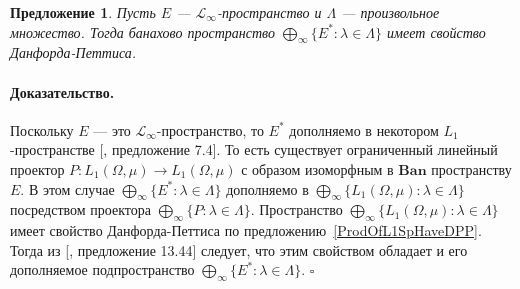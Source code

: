 \documentclass[12pt]{article}
\newtheorem{proposition}[theorem]{Предложение}
\renewenvironment{proof}{\paragraph{Доказательство.}}{\hfill$\square$\medskip}
\begin{document}
\begin{proposition}\label{ProdOfDualsOfMthscrLInftySpHaveDPP} Пусть $E$ ---
    $\mathscr{L}_\infty$-пространство и $\Lambda$ --- произвольное множество.
    Тогда банахово пространство $\bigoplus_\infty \{E^*:\lambda\in\Lambda \}$
    имеет свойство Данфорда-Петтиса.
\end{proposition}
\begin{proof} Поскольку $E$ --- это $\mathscr{L}_\infty$-пространство, то $E^*$
    дополняемо в некотором $L_1$-пространстве
    [\cite{LinPelAbsSumOpInLpSpAndApp}, предложение 7.4]. То есть существует
    ограниченный линейный проектор $P:L_1(\Omega,\mu)\to L_1(\Omega,\mu)$ с
    образом  изоморфным в $\mathbf{Ban}$ пространству $E$. В этом случае
    $\bigoplus_\infty \{ E^*:\lambda\in\Lambda \}$ дополняемо в
    $\bigoplus_\infty \{ L_1(\Omega,\mu):\lambda\in\Lambda \}$ посредством
    проектора $\bigoplus_\infty \{P:\lambda\in\Lambda \}$. Пространство
    $\bigoplus_\infty \{ L_1(\Omega,\mu):\lambda\in\Lambda \}$ имеет свойство
    Данфорда-Петтиса по предложению~\ref{ProdOfL1SpHaveDPP}. Тогда из
    [\cite{FabHabBanSpTh}, предложение 13.44] следует, что этим свойством
    обладает и его дополняемое подпространство $\bigoplus_\infty \{
        E^*:\lambda\in\Lambda \}$.
\end{proof}
\end{document}
